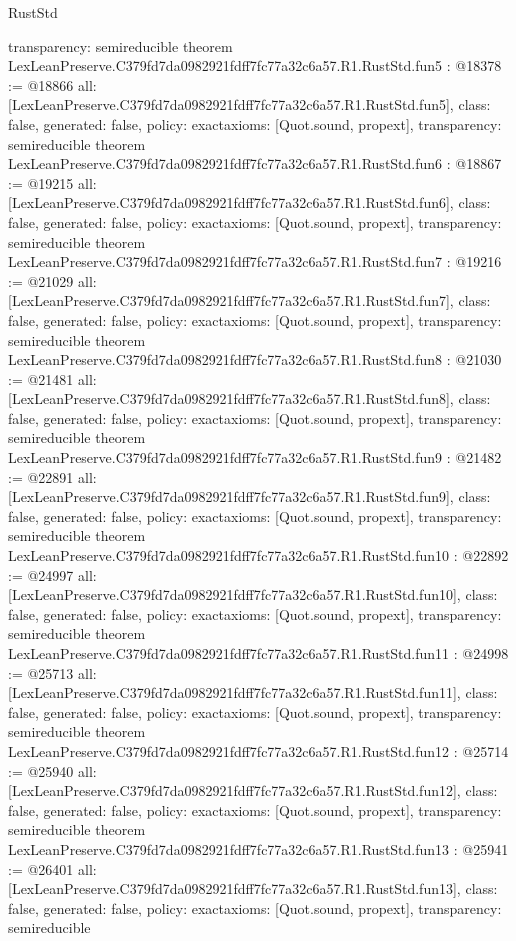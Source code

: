 \begin{lexlean}{RustStd}
\begin{coremodule}
{  transparency: semireducible
}
theorem LexLeanPreserve.C379fd7da0982921fdff7fc77a32c6a57.R1.RustStd.fun5 : @18378 := @18866 {
  all: [LexLeanPreserve.C379fd7da0982921fdff7fc77a32c6a57.R1.RustStd.fun5],
  class: false,
  generated: false,
  policy: exact{axioms: [Quot.sound, propext]},
  transparency: semireducible
}
theorem LexLeanPreserve.C379fd7da0982921fdff7fc77a32c6a57.R1.RustStd.fun6 : @18867 := @19215 {
  all: [LexLeanPreserve.C379fd7da0982921fdff7fc77a32c6a57.R1.RustStd.fun6],
  class: false,
  generated: false,
  policy: exact{axioms: [Quot.sound, propext]},
  transparency: semireducible
}
theorem LexLeanPreserve.C379fd7da0982921fdff7fc77a32c6a57.R1.RustStd.fun7 : @19216 := @21029 {
  all: [LexLeanPreserve.C379fd7da0982921fdff7fc77a32c6a57.R1.RustStd.fun7],
  class: false,
  generated: false,
  policy: exact{axioms: [Quot.sound, propext]},
  transparency: semireducible
}
theorem LexLeanPreserve.C379fd7da0982921fdff7fc77a32c6a57.R1.RustStd.fun8 : @21030 := @21481 {
  all: [LexLeanPreserve.C379fd7da0982921fdff7fc77a32c6a57.R1.RustStd.fun8],
  class: false,
  generated: false,
  policy: exact{axioms: [Quot.sound, propext]},
  transparency: semireducible
}
theorem LexLeanPreserve.C379fd7da0982921fdff7fc77a32c6a57.R1.RustStd.fun9 : @21482 := @22891 {
  all: [LexLeanPreserve.C379fd7da0982921fdff7fc77a32c6a57.R1.RustStd.fun9],
  class: false,
  generated: false,
  policy: exact{axioms: [Quot.sound, propext]},
  transparency: semireducible
}
theorem LexLeanPreserve.C379fd7da0982921fdff7fc77a32c6a57.R1.RustStd.fun10 : @22892 := @24997 {
  all: [LexLeanPreserve.C379fd7da0982921fdff7fc77a32c6a57.R1.RustStd.fun10],
  class: false,
  generated: false,
  policy: exact{axioms: [Quot.sound, propext]},
  transparency: semireducible
}
theorem LexLeanPreserve.C379fd7da0982921fdff7fc77a32c6a57.R1.RustStd.fun11 : @24998 := @25713 {
  all: [LexLeanPreserve.C379fd7da0982921fdff7fc77a32c6a57.R1.RustStd.fun11],
  class: false,
  generated: false,
  policy: exact{axioms: [Quot.sound, propext]},
  transparency: semireducible
}
theorem LexLeanPreserve.C379fd7da0982921fdff7fc77a32c6a57.R1.RustStd.fun12 : @25714 := @25940 {
  all: [LexLeanPreserve.C379fd7da0982921fdff7fc77a32c6a57.R1.RustStd.fun12],
  class: false,
  generated: false,
  policy: exact{axioms: [Quot.sound, propext]},
  transparency: semireducible
}
theorem LexLeanPreserve.C379fd7da0982921fdff7fc77a32c6a57.R1.RustStd.fun13 : @25941 := @26401 {
  all: [LexLeanPreserve.C379fd7da0982921fdff7fc77a32c6a57.R1.RustStd.fun13],
  class: false,
  generated: false,
  policy: exact{axioms: [Quot.sound, propext]},
  transparency: semireducible
}
\end{coremodule}
\end{lexlean}
